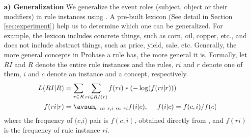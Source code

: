 \textbf{a) Generalization}
We generalize the event roles (subject, object or their modifiers) in rule instances using \zhpro. A pre-built lexicon (See detail in Section \ref{sec:experiment}) help us to determine which one can be generalized. For example, the lexicon includes concrete things, such as corn, oil, copper, etc., and does not include abstract things, such as price, yield, sale, etc. Generally, the more general concepts in Probase a rule has, the more general it is. Formally, let $RI$ and $R$ denote the entire rule instances and the rules, $ri$ and $r$ denote one of them, $i$ and $c$ denote an instance and a concept, respectively.
\begin{equation*}
\begin{split}
L(RI|R)&=\sum_{r \in R}\sum_{ri \in RI(r)}{f(ri)*(-\log(f(ri|r)))} \\
f(ri|r)&=\avsum_{c\ in\ r, i\ in\ ri}{f(i|c)}, \ \ \ \  f(i|c)=f(c,i)/f(c)
\end{split}
\label{equ:mdl_1}
\end{equation*}
where the frequency of ($c$,$i$) pair is $f(c,i)$, 
obtained directly from \zhpro, and $f(ri)$ is the frequency of rule instance $ri$.

